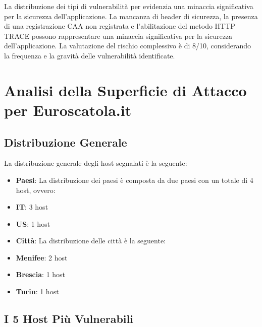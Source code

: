 La distribuzione dei tipi di vulnerabilità per  evidenzia una minaccia significativa per la sicurezza dell'applicazione. La mancanza di header di sicurezza, la presenza di una registrazione CAA non registrata e l'abilitazione del metodo HTTP TRACE possono rappresentare una minaccia significativa per la sicurezza dell'applicazione. La valutazione del rischio complessivo è di 8/10, considerando la frequenza e la gravità delle vulnerabilità identificate.

\chapter{Analisi della Superficie di Attacco per Euroscatola.it}

\section{Distribuzione Generale}

La distribuzione generale degli host segnalati è la seguente:
\begin{itemize}
\item \textbf{Paesi}: La distribuzione dei paesi è composta da due paesi con un totale di 4 host, ovvero:
\item \textbf{IT}: 3 host
\item \textbf{US}: 1 host
\item \textbf{Città}: La distribuzione delle città è la seguente:
\item \textbf{Menifee}: 2 host
\item \textbf{Brescia}: 1 host
\item \textbf{Turin}: 1 host
\end{itemize}
\section{I 5 Host Più Vulnerabili}

